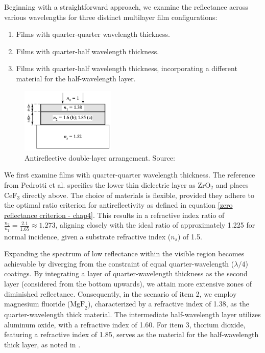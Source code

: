 Beginning with a straightforward approach, we examine the reflectance across various wavelengths for three distinct multilayer film configurations:
\begin{enumerate}
    \item Films with quarter-quarter wavelength thickness.
    \item Films with quarter-half wavelength thickness.
    \item Films with quarter-half wavelength thickness, incorporating a different material for the half-wavelength layer.
\end{enumerate}

\begin{figure}[ht!]
  \centering
  \includegraphics[width=0.4\textwidth]{Chapters/Figures/Chapter 4 Figures/Antireflecting Double Layer using Quarter and Half-Wavelength Thickness Films Layout.png}
  \caption{Antireflective double-layer arrangement. Source: \cite{pedrotti_introduction_2007}}
  \label{fig:antireflective_double_layer}
\end{figure}

We first examine films with quarter-quarter wavelength thickness. The reference from Pedrotti et al. specifies the lower thin dielectric layer as $\text{ZrO}_2$ and places $\text{CeF}_3$ directly above. The choice of materials is flexible, provided they adhere to the optimal ratio criterion for antireflectivity as defined in equation \ref{zero reflectance criterion - chap4}. This results in a refractive index ratio of $\frac{n_2}{n_1} = \frac{2.1}{1.65} \approx 1.273$, aligning closely with the ideal ratio of approximately 1.225 for normal incidence, given a substrate refractive index ($n_s$) of 1.5.

Expanding the spectrum of low reflectance within the visible region becomes achievable by diverging from the constraint of equal quarter-wavelength ($\lambda/4$) coatings. By integrating a layer of quarter-wavelength thickness as the second layer (considered from the bottom upwards), we attain more extensive zones of diminished reflectance. Consequently, in the scenario of item 2, we employ magnesium fluoride ($\text{MgF}_2$), characterized by a refractive index of 1.38, as the quarter-wavelength thick material. The intermediate half-wavelength layer utilizes aluminum oxide, with a refractive index of 1.60. For item 3, thorium dioxide, featuring a refractive index of 1.85, serves as the material for the half-wavelength thick layer, as noted in \cite{pedrotti_introduction_2007}.

